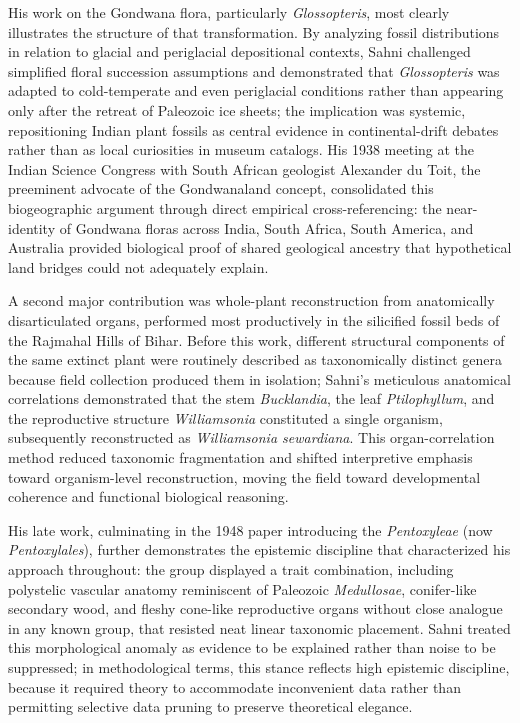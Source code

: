 \documentclass[10pt]{article}
\begin{document}
His work on the Gondwana flora, particularly \textit{Glossopteris}, most clearly illustrates the structure of that transformation. By analyzing fossil distributions in relation to glacial and periglacial depositional contexts, Sahni challenged simplified floral succession assumptions and demonstrated that \textit{Glossopteris} was adapted to cold-temperate and even periglacial conditions rather than appearing only after the retreat of Paleozoic ice sheets;\cite{regionalism_mobilism} the implication was systemic, repositioning Indian plant fossils as central evidence in continental-drift debates rather than as local curiosities in museum catalogs. His 1938 meeting at the Indian Science Congress with South African geologist Alexander du Toit, the preeminent advocate of the Gondwanaland concept,\cite{from_lahore_lucknow} consolidated this biogeographic argument through direct empirical cross-referencing: the near-identity of Gondwana floras across India, South Africa, South America, and Australia provided biological proof of shared geological ancestry that hypothetical land bridges could not adequately explain.\cite{regionalism_mobilism}

A second major contribution was whole-plant reconstruction from anatomically disarticulated organs, performed most productively in the silicified fossil beds of the Rajmahal Hills of Bihar.\cite{palaeobot_bio} Before this work, different structural components of the same extinct plant were routinely described as taxonomically distinct genera because field collection produced them in isolation; Sahni's meticulous anatomical correlations demonstrated that the stem \textit{Bucklandia}, the leaf \textit{Ptilophyllum}, and the reproductive structure \textit{Williamsonia} constituted a single organism, subsequently reconstructed as \textit{Williamsonia sewardiana}.\cite{from_lahore_lucknow} This organ-correlation method reduced taxonomic fragmentation and shifted interpretive emphasis toward organism-level reconstruction, moving the field toward developmental coherence and functional biological reasoning.\cite{palaeobot_bio}

His late work, culminating in the 1948 paper introducing the \textit{Pentoxyleae} (now \textit{Pentoxylales}), further demonstrates the epistemic discipline that characterized his approach throughout: the group displayed a trait combination, including polystelic vascular anatomy reminiscent of Paleozoic \textit{Medullosae}, conifer-like secondary wood, and fleshy cone-like reproductive organs without close analogue in any known group, that resisted neat linear taxonomic placement.\cite{pentoxylales_affinities} Sahni treated this morphological anomaly as evidence to be explained rather than noise to be suppressed; in methodological terms, this stance reflects high epistemic discipline, because it required theory to accommodate inconvenient data rather than permitting selective data pruning to preserve theoretical elegance.\cite{from_lahore_lucknow}
\end{document}
